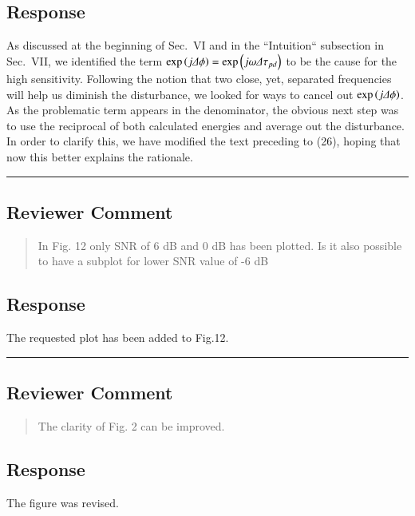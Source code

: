 \subsection{Response} 
As discussed at the beginning of Sec.~VI and in the ``Intuition`` subsection in Sec.~VII, we identified the term $\exp\Brack{j\dPhi}=\exp\Brack{j\omega\Delta\tau_{pd}}$ to be the cause for the high sensitivity. Following the notion that two close, yet, separated frequencies will help us diminish the disturbance, we looked for ways to cancel out $\exp\Brack{j\dPhi}$. As the problematic term appears in the denominator, the obvious next step was to use the reciprocal of both calculated energies and average out the disturbance. In order to clarify this, we have modified the text preceding to (26), hoping that now this better explains the rationale. 

\noindent\rule{17cm}{2.0pt}

\subsection{Reviewer Comment}
\begin{mdframed}
\begin{quote}
In Fig. 12 only SNR of 6 dB and 0 dB has been plotted. Is it also possible to have a subplot for lower SNR value of -6 dB
\end{quote}
\end{mdframed}

\subsection{Response} 
The requested plot has been added to Fig.12. 

\noindent\rule{17cm}{2.0pt}

\subsection{Reviewer Comment}
\begin{mdframed}
\begin{quote}
The clarity of Fig. 2 can be improved.
\end{quote}
\end{mdframed}

\subsection{Response} 
The figure was revised.

